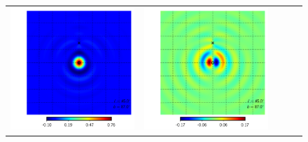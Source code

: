 \documentclass[a4paper,11pt]{article}
\begin{document}
\begin{figure}[!t]
\begin{center}
\begin{tabular}{m{8ex}m{}m{}|m{}m{}}
\hspace{\kernelfigspace}\includegraphics[width=\kernelfigwidth]{qu2ebqu_rker_I_lat87_lon45.pdf} &
\hspace{\kernelfigspace}\includegraphics[width=\kernelfigwidth]{qu2ebqu_iker_I_lat87_lon45.pdf} \\

\end{tabular}
\end{center}
\end{figure}
\end{document}
